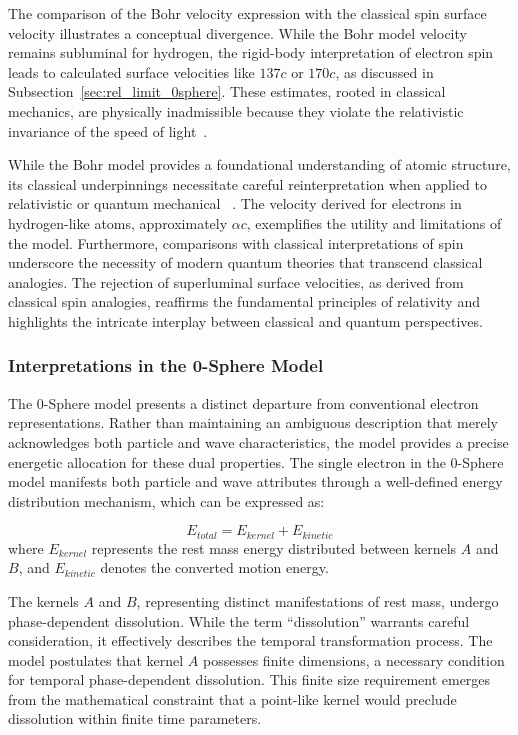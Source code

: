 \documentclass[%
 reprint,
 amsmath,amssymb,
 aps,
]{revtex4-1}
\numberwithin{equation}{section}%
\begin{document}
The comparison of the Bohr velocity expression with the classical spin surface velocity illustrates a conceptual divergence. While the Bohr model velocity remains subluminal for hydrogen, the rigid-body interpretation of electron spin leads to calculated surface velocities like \( 137c \) or \( 170c \), as discussed in Subsection~\ref{sec:rel_limit_0sphere}. These estimates, rooted in classical mechanics, are physically inadmissible because they violate the relativistic invariance of the speed of light~\cite{Tomonaga1997, Ohanian1986}.

While the Bohr model provides a foundational understanding of atomic structure, its classical underpinnings necessitate careful reinterpretation when applied to relativistic or quantum mechanical ~\cite{Dirac1928}. The velocity derived for electrons in hydrogen-like atoms, approximately \( \alpha c \), exemplifies the utility and limitations of the model. Furthermore, comparisons with classical interpretations of spin underscore the necessity of modern quantum theories that transcend classical analogies. The rejection of superluminal surface velocities, as derived from classical spin analogies, reaffirms the fundamental principles of relativity and highlights the intricate interplay between classical and quantum perspectives.


\subsubsection{Interpretations in the 0-Sphere Model}
The 0-Sphere model presents a distinct departure from conventional electron representations. Rather than maintaining an ambiguous description that merely acknowledges both particle and wave characteristics, the model provides a precise energetic allocation for these dual properties. The single electron in the 0-Sphere model manifests both particle and wave attributes through a well-defined energy distribution mechanism, which can be expressed as:

\begin{equation}
E_{total} = E_{kernel} + E_{kinetic}
\label{eq:energy_distribution}
\end{equation}
where $E_{kernel}$ represents the rest mass energy distributed between kernels $A$ and $B$, and $E_{kinetic}$ denotes the converted motion energy.

The kernels $A$ and $B$, representing distinct manifestations of rest mass, undergo phase-dependent dissolution. While the term ``dissolution'' warrants careful consideration, it effectively describes the temporal transformation process. The model postulates that kernel $A$ possesses finite dimensions, a necessary condition for temporal phase-dependent dissolution. This finite size requirement emerges from the mathematical constraint that a point-like kernel would preclude dissolution within finite time parameters.
\end{document}

